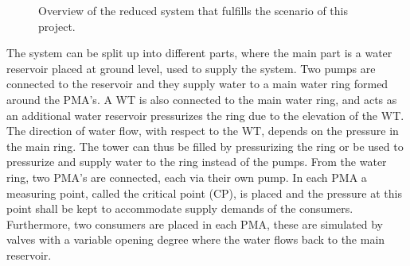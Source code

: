 \begin{figure}[H]
\centering
 
\caption{Overview of the reduced system that fulfills the scenario of this project.}
\label{fig:sys_model_overview}
\end{figure}\vspace{-0.5cm}
The system can be split up into different parts, where the main part is a water reservoir placed at ground level, used to supply the system. Two pumps are connected to the reservoir and they supply water to a main water ring formed around the PMA's. 
A WT is also connected to the main water ring, and acts as an additional water reservoir pressurizes the ring due to the elevation of the WT. The direction of water flow, with respect to the WT, depends on the pressure in the main ring. The tower can thus be filled by pressurizing the ring or be used to pressurize and supply water to the ring instead of the pumps.  
From the water ring, two PMA's are connected, each via their own pump. In each PMA a measuring point, called the critical point (CP), is placed and the pressure at this point shall be kept to accommodate supply demands of the consumers. Furthermore, two consumers are placed in each PMA, these are simulated by valves with a variable opening degree where the water flows back to the main reservoir.    

	
